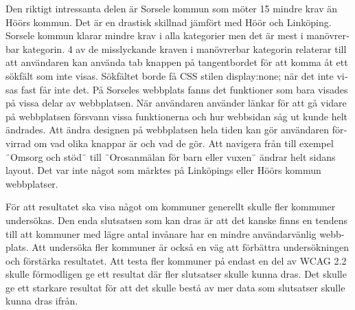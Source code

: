 \documentclass[11p]{article}
\begin{document}
\begin{otherlanguage}{swedish}
    Den riktigt intressanta delen är Sorsele kommun som möter 15 mindre krav än Höörs kommun.
    Det är en drastisk skillnad jämfört med Höör och Linköping.
    Sorsele kommun klarar mindre krav i alla kategorier men det är mest i manövrerbar kategorin.
    4 av de misslyckande kraven i manövrerbar kategorin relaterar till att användaren kan använda tab knappen på tangentbordet för att komma åt ett sökfält som inte visas.
    Sökfältet borde få CSS stilen display:none; när det inte visas fast får inte det.
    På Sorseles webbplats fanns det funktioner som bara visades på vissa delar av webbplatsen.
    När användaren använder länkar för att gå vidare på webbplatsen försvann vissa funktionerna och hur webbsidan såg ut kunde helt ändrades.
    Att ändra designen på webbplatsen hela tiden kan gör användaren förvirrad om vad olika knappar är och vad de gör.
    Att navigera från till exempel ¨Omsorg och stöd¨ till ¨Orosanmälan för barn eller vuxen¨ ändrar helt sidans layout.
    Det var inte något som märktes på Linköpings eller Höörs kommun webbplatser.


    För att resultatet ska visa något om kommuner generellt skulle fler kommuner undersökas.
    Den enda slutsatsen som kan dras är att det kanske finns en tendens till att kommuner med lägre antal invånare har en mindre användarvänlig webbplats.
    Att undersöka fler kommuner är också en väg att förbättra undersökningen och förstärka resultatet.
    Att testa fler kommuner på endast en del av WCAG 2.2 skulle förmodligen ge ett resultat där fler slutsatser skulle kunna dras.
    Det skulle ge ett starkare resultat för att det skulle bestå av mer data som slutsatser skulle kunna dras ifrån.


\end{otherlanguage}
\end{document}
